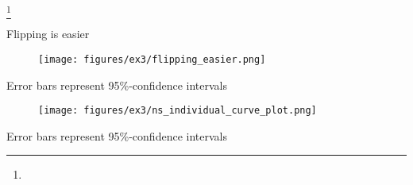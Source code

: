 \documentclass{beamer}
\newcommand\blfootnote[1]{%
  \begingroup
  \renewcommand\thefootnote{}\footnote{#1}%
  \addtocounter{footnote}{-1}%
  \endgroup
}
\begin{document}
\begin{frame}[allowframebreaks]

\blfootnote{}
\end{frame}

\appendix

\begin{frame}{Flipping is easier}
\begin{figure}
\centering
\texttt{[image: figures/ex3/flipping\_easier.png]}
\end{figure}
{\scriptsize Error bars represent 95\%-confidence intervals}
\end{frame}

\begin{frame}
\begin{figure}
\centering
\texttt{[image: figures/ex3/ns\_individual\_curve\_plot.png]}
\end{figure}
{\scriptsize Error bars represent 95\%-confidence intervals}
\end{frame}
\end{document}
